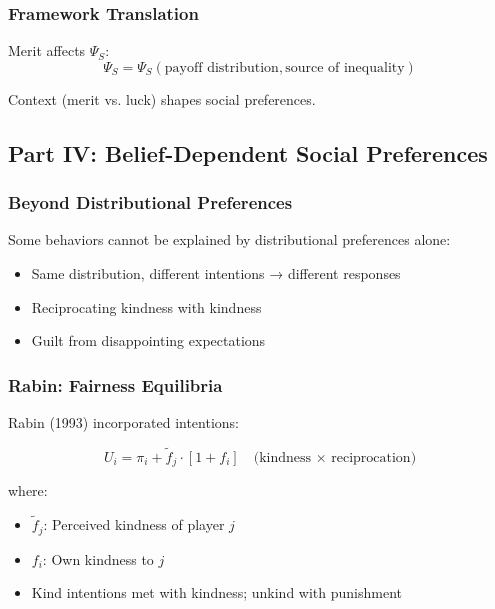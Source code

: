 \subsubsection{Framework Translation}

Merit affects $\Psi_S$:
\begin{equation}
\Psi_S = \Psi_S(\text{payoff distribution}, \text{source of inequality})
\end{equation}

Context (merit vs. luck) shapes social preferences.

\subsection{Part IV: Belief-Dependent Social Preferences}

\subsubsection{Beyond Distributional Preferences}

Some behaviors cannot be explained by distributional preferences alone:
\begin{itemize}
    \item Same distribution, different intentions → different responses
    \item Reciprocating kindness with kindness
    \item Guilt from disappointing expectations
\end{itemize}

\subsubsection{Rabin: Fairness Equilibria}

Rabin (1993) incorporated intentions:

\begin{equation}
\boxed{
U_i = \pi_i + \tilde{f}_j \cdot [1 + f_i] \quad \text{(kindness × reciprocation)}
}
\label{eq:rabin}
\end{equation}

where:
\begin{itemize}
    \item $\tilde{f}_j$: Perceived kindness of player $j$
    \item $f_i$: Own kindness to $j$
    \item Kind intentions met with kindness; unkind with punishment
\end{itemize}

